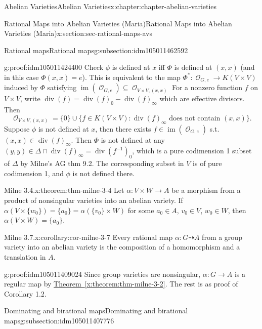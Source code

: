 \documentclass[oneside,10pt,]{book}
\numberwithin{equation}{section}
\newcommand{\sheaf}[1]{\operatorname{\mathcal{#1}}}
\DeclareMathOperator{\divisor}{div}
\DeclareMathOperator{\im}{im}
\begin{document}
\begin{chapterptx}{Abelian Varieties}{}{Abelian Varieties}{}{}{x:chapter:chapter-abelian-varieties}
\begin{sectionptx}{Rational Maps into Abelian Varieties (Maria)}{}{Rational Maps into Abelian Varieties (Maria)}{}{}{x:section:sec-rational-maps-avs}
\begin{subsectionptx}{Rational maps}{}{Rational maps}{}{}{g:subsection:idm105011462592}
\begin{proofptx}{}{g:proof:idm105011424400}
Check \(\phi\) is defined at \(x\) iff \(\Phi\) is defined at \((x,x)\) (and in this case \(\Phi(x,x) = e\)). This is equivalent to the map \(\Phi^*\colon \sheaf O_{G,e} \to K(V\times V)\) induced by  \(\Phi\) satisfying   \(\im(\sheaf O_{G,e}) \subseteq \sheaf O_{V\times V, (x,x)}\) For a nonzero function \(f\) on \(V\times V\), write \(\divisor(f) = \divisor(f)_0 - \divisor(f)_\infty\) which are effective divisors. Then%
\begin{equation*}
\sheaf O_{V\times V, (x,x)} = \{0\} \cup \{f\in K(V\times V) : \divisor(f)_\infty \text{ does not contain }(x,x)\}\text{.}
\end{equation*}
Suppose \(\phi\) is not defined at \(x\), then there exists \(f\in \im(\sheaf O_{G,e})\) s.t. \((x,x) \in \divisor(f)_\infty\). Then \(\Phi\) is not defined at any \((y,y) \in \Delta \cap  \divisor(f)_\infty = \divisor(f^{-1})_0\), which is a pure codimension 1 subset of \(\Delta\) by Milne's AG thm 9.2. The corresponding subset in \(V\) is of pure codimension 1, and \(\phi\) is not defined there.%
\end{proofptx}
\begin{theorem}{Milne 3.4.}{}{x:theorem:thm-milne-3-4}%
Let \(\alpha \colon V \times W \to A\) be a morphism from a product of nonsingular varieties into an abelian variety. If \(\alpha (V\times\{w_0\}) = \{a_0 \} =  \alpha(\{v_0 \}\times W)\) for some \(a_0 \in A\), \(v_0\in V\), \(w_0 \in W\), then \(\alpha(V\times W) = \{a_0\}\).%
\end{theorem}
\begin{corollary}{Milne 3.7.}{}{x:corollary:cor-milne-3-7}%
Every rational map \(\alpha \colon G\dashrightarrow A\) from a group variety into an abelian variety is the composition of a homomorphism and a translation in \(A\).%
\end{corollary}
\begin{proofptx}{}{g:proof:idm105011409024}
Since group varieties are nonsingular, \(\alpha\colon G \to A\) is a regular map by \hyperref[x:theorem:thm-milne-3-2]{Theorem~\ref{x:theorem:thm-milne-3-2}}. The rest is as proof of Corollary 1.2.%
\end{proofptx}
\end{subsectionptx}
%
%
\typeout{************************************************}
\typeout{************************************************}
%
\begin{subsectionptx}{Dominating and birational maps}{}{Dominating and birational maps}{}{}{g:subsection:idm105011407776}

\end{subsectionptx}
\end{sectionptx}
\end{chapterptx}
\end{document}
